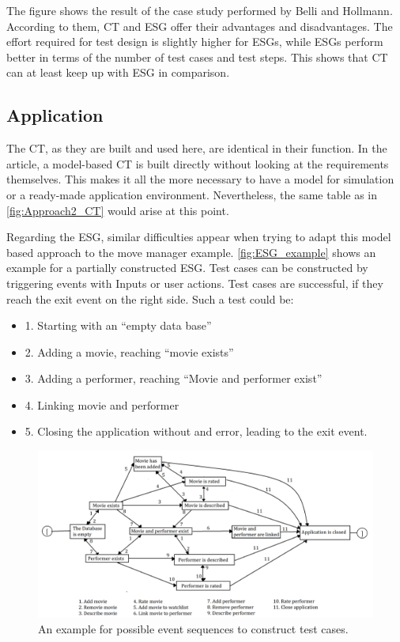 The figure shows the result of the case study performed by Belli and Hollmann\cite{Belli2009}. According to them, CT and ESG offer their advantages and disadvantages. The effort required for test design is slightly higher for ESGs, while ESGs perform better in terms of the number of test cases and test steps. This shows that CT can at least keep up with ESG in comparison.

\subsection{Application}

The CT, as they are built and used here, are identical in their function. In the article, a model-based CT is built directly without looking at the requirements themselves. This makes it all the more necessary to have a model for simulation or a ready-made application environment. Nevertheless, the same table as in \autoref{fig:Approach2_CT} would arise at this point.

Regarding the ESG, similar difficulties appear when trying to adapt this model based approach to the move manager example. \autoref{fig:ESG_example} shows an example for a partially constructed ESG. Test cases can be constructed by triggering events with Inputs or user actions. Test cases are successful, if they reach the exit event on the right side. Such a test could be: 

\begin{itemize}
	\item 1. Starting with an \enquote{empty data base}
	\item 2. Adding a movie, reaching \enquote{movie exists}
	\item 3. Adding a performer, reaching \enquote{Movie and performer exist}
	\item 4. Linking movie and performer
	\item 5. Closing the application without and error, leading to the exit event.
\end{itemize}

\begin{figure}[H]
\centering
\includegraphics[scale=0.175]{../images/ESGamBeispiel2.png} 
\caption{An example for possible event sequences to construct test cases.}
\label{fig:ESG_example}
\end{figure}

